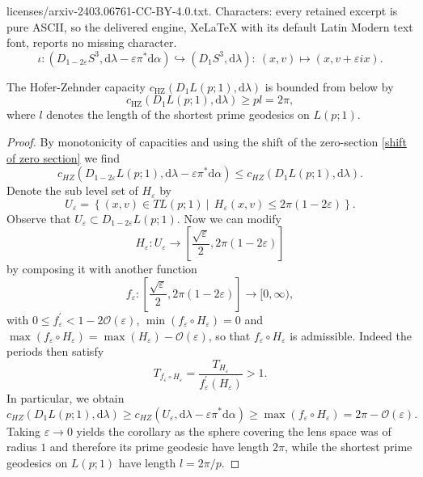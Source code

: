 \documentclass[10pt,a4paper]{amsart}
\newcommand{\dd}{\mathrm{d}}
\newcommand{\hz}{\mathrm{HZ}}
\begin{document}
licenses/arxiv-2403.06761-CC-BY-4.0.txt. Characters: every retained excerpt is pure ASCII, so the delivered engine, XeLaTeX with its default Latin Modern text font, reports no missing character.
\begin{equation}\label{shift of zero section}
\iota: (D_{1-2\varepsilon}S^3, \dd\lambda-\varepsilon\pi^*\dd\alpha)\hookrightarrow (D_1 S^3,\dd\lambda):\ (x,v)\mapsto (x,v+\varepsilon ix).
\end{equation}

\begin{Corollary}\label{lower bound Hofer Zehnder capacity}
The Hofer-Zehnder capacity $c_{\hz}(D_1L(p;1),\dd\lambda)$ is bounded from below by  
$$c_{\hz}(D_1L(p;1),\dd\lambda)\geq pl=2\pi,$$
    where $l$ denotes the length of the shortest prime geodesics on $L(p;1)$.
\end{Corollary}

\begin{proof} By monotonicity of capacities and using the shift     of the zero-section \eqref{shift of zero section} we find
    $$
    c_{HZ}(D_{1-2\varepsilon}L(p;1),\dd\lambda-\varepsilon\pi^*\dd\alpha)\leq c_{HZ}(D_1L(p;1),\dd\lambda).
    $$
    Denote the sub level set of $H_\varepsilon$ by
    $$
    U_\varepsilon=\left\lbrace (x,v)\in TL(p;1)\ \Big\vert\ \ H_\varepsilon (x,v) \leq 2\pi(1-2\varepsilon)\right\rbrace.
    $$
    Observe that $U_\varepsilon\subset D_{1-2\varepsilon}L(p;1)$. Now we can modify
    $$H_\varepsilon: U_\varepsilon\to \left [\frac{\sqrt\varepsilon}{2}, 2\pi(1-2\varepsilon)\right ]$$ 
    by composing it with another function 
    $$
    f_{\varepsilon}: \left [\frac{\sqrt\varepsilon}{2}, 2\pi(1-2\varepsilon)\right ]\to [0,\infty),
    $$
    with $0\leq f_{\varepsilon}^{\prime}<1-2\mathcal{O}(\varepsilon)$, $\min(f_{\varepsilon}\circ H_\varepsilon)=0$ and $\max(f_{\varepsilon}\circ H_\varepsilon)=\max(H_{\varepsilon})-\mathcal{O}(\varepsilon)$, so that $f_{\varepsilon}\circ H_\varepsilon$ is admissible. Indeed the periods then satisfy
    $$
    T_{f_{\varepsilon}\circ H_\varepsilon}=\frac{T_{H_\varepsilon}}{f^{\prime}_{\varepsilon}(H_\varepsilon)}>1.
    $$
    In particular, we obtain
    $$
    c_{HZ}(D_1L(p;1),\dd\lambda)\geq c_{HZ}(U_\varepsilon,\dd\lambda-\varepsilon\pi^*\dd\alpha)\geq \max(f_\varepsilon\circ H_\varepsilon)= 2\pi -\mathcal{O}(\varepsilon).
    $$
    Taking $\varepsilon\to 0$ yields the corollary as the sphere covering the lens space was of radius $1$ and therefore its prime geodesic have length $2\pi$, while the shortest prime geodesics on $L(p;1)$ have length $l=2\pi/p$.
\end{proof}
\end{document}
